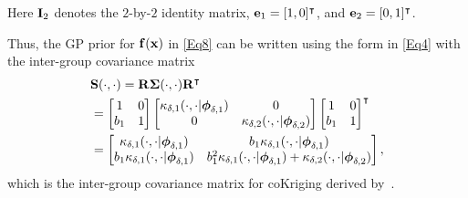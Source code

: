 \documentclass[iicol,sn-basic]{sn-jnl}%
\begin{document}
Here ${\bf I}_2$ denotes the $2$-by-$2$ identity matrix, ${\bf e}_1 = [1,0]^\intercal$, and ${\bf e}_2 = [0,1]^\intercal$. 

Thus, the GP prior for ${\bf f}({\bf x})$ in \cref{Eq8} can be written using the form in \cref{Eq4} with the inter-group covariance matrix
\begin{equation}\label{Eq10}
	\begin{aligned}
		& {\bf S}(\cdot,\cdot)  = {\bf R} {\boldsymbol \Sigma}(\cdot,\cdot) {\bf R}^\intercal \\
		 & = \left[\begin{matrix}
		 	1 & 0 \\
		 	b_1 & 1
		 \end{matrix}\right] 
		 \left[\begin{matrix}
		 	\kappa_{\delta,1}(\cdot,\cdot|{\boldsymbol \phi}_{\delta,1}) & 0 \\
		 	0 & \kappa_{\delta,2}(\cdot,\cdot|{\boldsymbol \phi}_{\delta,2})
		 \end{matrix}\right]
		 \left[\begin{matrix}
		 	1 & 0 \\
		 	b_1 & 1
		 \end{matrix}\right]^\intercal \\
	 & = \left[\begin{matrix}
	 	\kappa_{\delta,1}(\cdot,\cdot|{\boldsymbol \phi}_{\delta,1}) & b_1 \kappa_{\delta,1}(\cdot,\cdot|{\boldsymbol \phi}_{\delta,1}) \\
	 	b_1 \kappa_{\delta,1}(\cdot,\cdot|{\boldsymbol \phi}_{\delta,1}) & b_1^2 \kappa_{\delta,1}(\cdot,\cdot|{\boldsymbol \phi}_{\delta,1})+\kappa_{\delta,2}(\cdot,\cdot|{\boldsymbol \phi}_{\delta,2})
	 \end{matrix}\right], 
	\end{aligned}
\end{equation}
which is the inter-group covariance matrix for coKriging derived by~\cite{Forrester2007}.
\end{document}
